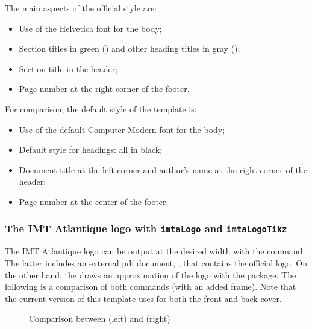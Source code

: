 \documentclass{report}
\begin{document}
\vspace{1em}
The main aspects of the official style are:

\begin{itemize}
    \item Use of the Helvetica font for the body;
    \item Section titles in green () and other heading titles in gray ();
    \item Section title in the header;
    \item Page number at the right corner of the footer.
\end{itemize}

\vspace{1em}
For comparison, the default style of the template is:

\begin{itemize}
    \item Use of the default Computer Modern font for the body;
    \item Default style for headings: all in black;
    \item Document title at the left corner and author's name at the right corner of the header;
    \item Page number at the center of the footer.
\end{itemize}

\subsubsection{The IMT Atlantique logo with \texttt{imtaLogo} and \texttt{imtaLogoTikz}}
The IMT Atlantique logo can be output at the desired width with the  command.
The latter includes an external pdf document, , that contains the official logo.
On the other hand, the  draws an approximation of the logo with the  package.
The following is a comparison of both commands (with an added frame). Note that the current version of this template uses  for both the front and back cover.

\begin{figure}[H]
    \centering
    \fbox{\imtaLogo{5cm}}
    \fbox{\imtaLogoTikz{5cm}}
    \caption{Comparison between  (left) and  (right)}
    \label{fig:imtaLogo}
\end{figure}
\end{document}
